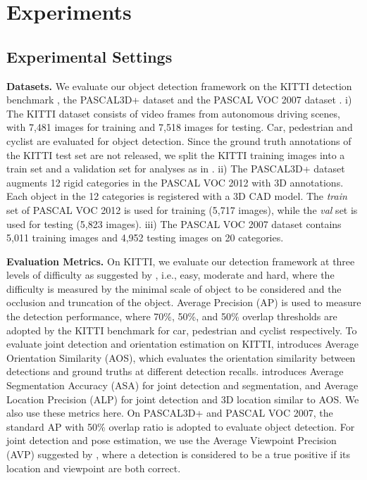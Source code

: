 \documentclass[10pt,twocolumn,letterpaper]{article}
\begin{document}
\section{Experiments} \label{sec:exp}

\subsection{Experimental Settings}
	
\noindent \textbf{Datasets.} We evaluate our object detection framework on the KITTI detection benchmark \cite{geiger2012we}, the PASCAL3D+ dataset \cite{xiang2014beyond} and the PASCAL VOC 2007 dataset \cite{Everingham10}. i) The KITTI dataset consists of video frames from autonomous driving scenes, with 7,481 images for training and 7,518 images for testing. Car, pedestrian and cyclist are evaluated for object detection. Since the ground truth annotations of the KITTI test set are not released, we split the KITTI training images into a train set and a validation set for analyses as in \cite{xiang2015data}. ii) The PASCAL3D+ dataset augments 12 rigid categories in the PASCAL VOC 2012 \cite{pascal-voc-2012} with 3D annotations. Each object in the 12 categories is registered with a 3D CAD model. The \emph{train} set of PASCAL VOC 2012 is used for training (5,717 images), while the \emph{val} set is used for testing (5,823 images). iii) The PASCAL VOC 2007 dataset \cite{Everingham10} contains 5,011 training images and 4,952 testing images on 20 categories.





	


\noindent \textbf{Evaluation Metrics.} On KITTI, we evaluate our detection framework at three levels of difficulty as suggested by \cite{KITTIObject}, i.e., easy, moderate and hard, where the difficulty is measured by the minimal scale of object to be considered and the occlusion and truncation of the object. Average Precision (AP) \cite{pascal-voc-2012} is used to measure the detection performance, where 70\%, 50\%, and 50\% overlap thresholds are adopted by the KITTI benchmark for car, pedestrian and cyclist respectively. To evaluate joint detection and orientation estimation on KITTI, \cite{geiger2012we} introduces Average Orientation Similarity (AOS), which evaluates the orientation similarity between detections and ground truths at different detection recalls. \cite{xiang2015data} introduces Average Segmentation Accuracy (ASA) for joint detection and segmentation, and Average Location Precision (ALP) for joint detection and 3D location similar to AOS. We also use these metrics here. On PASCAL3D+ and PASCAL VOC 2007, the standard AP with 50\% overlap ratio is adopted to evaluate object detection. For joint detection and pose estimation, we use the Average Viewpoint Precision (AVP) suggested by \cite{xiang2014beyond}, where a detection is considered to be a true positive if its location and viewpoint are both correct.
\end{document}
